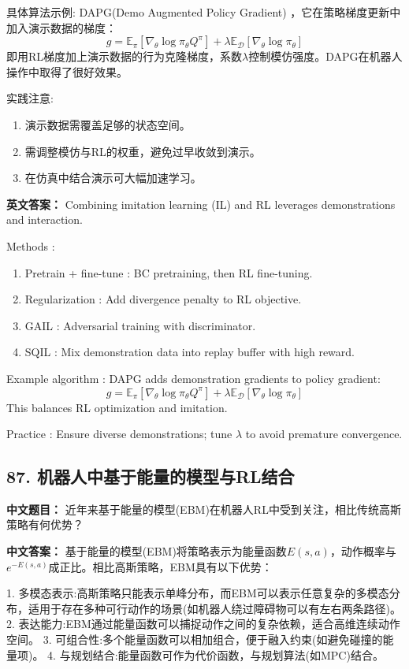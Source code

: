 \documentclass[10pt,a4paper]{ctexart}
\begin{document}
 具体算法示例: DAPG(Demo Augmented Policy Gradient) ，它在策略梯度更新中加入演示数据的梯度：
\[
g = \mathbb{E}_{\pi} [\nabla_\theta \log \pi_\theta Q^{\pi}] + \lambda \mathbb{E}_{\mathcal{D}} [\nabla_\theta \log \pi_\theta]
\]
即用RL梯度加上演示数据的行为克隆梯度，系数\(\lambda\)控制模仿强度。DAPG在机器人操作中取得了很好效果。

 实践注意:
\begin{enumerate}
    \item 演示数据需覆盖足够的状态空间。
    \item 需调整模仿与RL的权重，避免过早收敛到演示。
    \item 在仿真中结合演示可大幅加速学习。
\end{enumerate}

\textbf{英文答案：}  
Combining imitation learning (IL) and RL leverages demonstrations and interaction.

 Methods :
\begin{enumerate}
    \item Pretrain + fine-tune : BC pretraining, then RL fine-tuning.
    \item Regularization : Add divergence penalty to RL objective.
    \item GAIL : Adversarial training with discriminator.
    \item SQIL : Mix demonstration data into replay buffer with high reward.
\end{enumerate}

 Example algorithm :  DAPG  adds demonstration gradients to policy gradient:
\[
g = \mathbb{E}_{\pi} [\nabla_\theta \log \pi_\theta Q^{\pi}] + \lambda \mathbb{E}_{\mathcal{D}} [\nabla_\theta \log \pi_\theta]
\]
This balances RL optimization and imitation.

 Practice : Ensure diverse demonstrations; tune \(\lambda\) to avoid premature convergence.

\subsection*{87. 机器人中基于能量的模型与RL结合}
\textbf{中文题目：} 近年来基于能量的模型(EBM)在机器人RL中受到关注，相比传统高斯策略有何优势？

\textbf{中文答案：}  
基于能量的模型(EBM)将策略表示为能量函数\(E(s,a)\)，动作概率与\(e^{-E(s,a)}\)成正比。相比高斯策略，EBM具有以下优势：

1.  多模态表示:高斯策略只能表示单峰分布，而EBM可以表示任意复杂的多模态分布，适用于存在多种可行动作的场景(如机器人绕过障碍物可以有左右两条路径)。
2.  表达能力:EBM通过能量函数可以捕捉动作之间的复杂依赖，适合高维连续动作空间。
3.  可组合性:多个能量函数可以相加组合，便于融入约束(如避免碰撞的能量项)。
4.  与规划结合:能量函数可作为代价函数，与规划算法(如MPC)结合。
\end{document}
